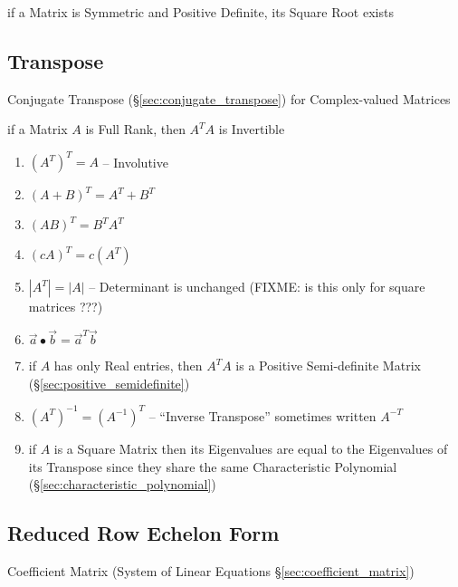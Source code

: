 if a Matrix is Symmetric and Positive Definite, its Square Root exists



\subsection{Transpose}\label{sec:transpose}

Conjugate Transpose (\S\ref{sec:conjugate_transpose}) for Complex-valued
Matrices

if a Matrix $A$ is Full Rank, then $A^TA$ is Invertible

\begin{enumerate}
  \item $(A^T)^T = A$ -- Involutive
  \item $(A+B)^T = A^T + B^T$
  \item $(AB)^T = B^T A^T$
  \item $(cA)^T = c(A^T)$
  \item $|A^T| = |A|$ -- Determinant is unchanged (FIXME: is this only for
    square matrices ???)
  \item $\vec{a} \bullet \vec{b} = \vec{a}^T\vec{b}$
  \item if $A$ has only Real entries, then $A^T A$ is a Positive Semi-definite
    Matrix (\S\ref{sec:positive_semidefinite})
  \item $(A^T)^{-1} = (A^{-1})^T$ -- ``Inverse Transpose'' sometimes written
    $A^{-T}$
  \item if $A$ is a Square Matrix then its Eigenvalues are equal to the
    Eigenvalues of its Transpose since they share the same Characteristic
    Polynomial (\S\ref{sec:characteristic_polynomial})
\end{enumerate}



\subsection{Reduced Row Echelon Form}\label{sec:reduced_row_echelon}

Coefficient Matrix (System of Linear Equations \S\ref{sec:coefficient_matrix})



